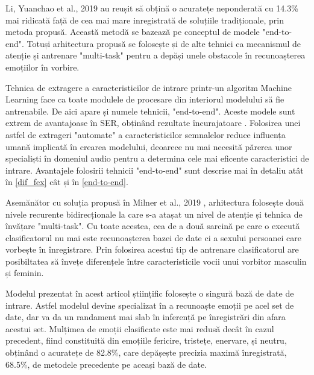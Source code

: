 \documentclass[a4paper,12pt]{book}
\begin{document}
					Li, Yuanchao et al., 2019 \cite{yuan} au reușit să obțină o acuratețe neponderată cu 14.3\% mai ridicată față de cea mai mare inregistrată de soluțiile tradiționale, prin metoda propusă. Această metodă se bazează pe conceptul de modele "end-to-end". Totuși arhitectura propusă se folosește și de alte tehnici ca mecanismul de atenție și antrenare "multi-task" pentru a depăși unele obstacole în recunoașterea emoțiilor în vorbire. \par
					
					Tehnica de extragere a caracteristicilor de intrare printr-un algoritm Machine Learning face ca toate modulele de procesare din interiorul modelului să fie antrenabile. De aici apare și numele tehnicii, "end-to-end". Aceste modele sunt extrem de avantajoase în SER, obținând rezultate încurajatoare \cite{adieu,e2e}. Folosirea unei astfel de extrageri "automate" a caracteristicilor semnalelor reduce influența umană implicată în crearea modelului, deoarece nu mai necesită părerea unor specialiști în domeniul audio pentru a determina cele mai eficente caracteristici de intrare. Avantajele folosirii tehnicii "end-to-end" sunt descrise mai în detaliu atât în \ref{dif_fex} cât și în \ref{end-to-end}. \par
					
					Asemănător cu soluția propusă în Milner et al., 2019 \cite{multi-domain}, arhitectura folosește două nivele recurente bidirecționale la care s-a atașat un nivel de atenție și tehnica de  învățare "multi-task". Cu toate acestea, cea de a două sarcină pe care o execută clasificatorul nu mai este recunoașterea bazei de date ci a sexului persoanei care vorbește în înregistrare. Prin folosirea acestui tip de antrenare clasificatorul are posibiltatea să învețe diferențele între caracteristicile vocii unui vorbitor masculin și feminin. \par
					
					Modelul prezentat în acest articol științific folosește o singură bază de date de intrare. Astfel modelul devine specializat în a recunoaște emoții pe acel set de date, dar va da un randament mai slab în inferență pe înregistrări din afara acestui set. Mulțimea de emoții clasificate este mai redusă  decât în cazul precedent, fiind constituită din emoțiile fericire, tristețe, enervare, și neutru, obținând o acuratețe de 82.8\%, care depășește precizia maximă înregistrată, 68.5\%, de metodele precedente pe aceași bază de date.
\end{document}
